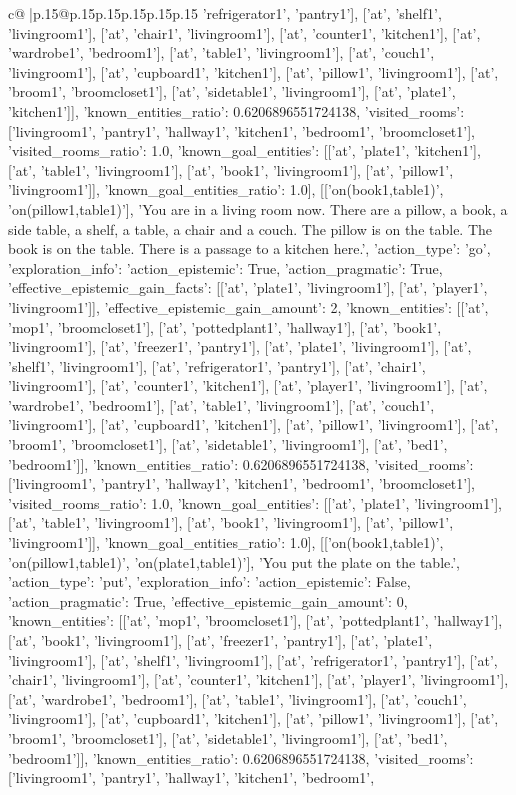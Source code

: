 \documentclass{article}
\begin{document}
{\begin{supertabular}{c@{$\;$}|p{.15\linewidth}@{}p{.15\linewidth}p{.15\linewidth}p{.15\linewidth}p{.15\linewidth}p{.15\linewidth}}
{{{'refrigerator1', 'pantry1'], ['at', 'shelf1', 'livingroom1'], ['at', 'chair1', 'livingroom1'], ['at', 'counter1', 'kitchen1'], ['at', 'wardrobe1', 'bedroom1'], ['at', 'table1', 'livingroom1'], ['at', 'couch1', 'livingroom1'], ['at', 'cupboard1', 'kitchen1'], ['at', 'pillow1', 'livingroom1'], ['at', 'broom1', 'broomcloset1'], ['at', 'sidetable1', 'livingroom1'], ['at', 'plate1', 'kitchen1']], 'known_entities_ratio': 0.6206896551724138, 'visited_rooms': ['livingroom1', 'pantry1', 'hallway1', 'kitchen1', 'bedroom1', 'broomcloset1'], 'visited_rooms_ratio': 1.0, 'known_goal_entities': [['at', 'plate1', 'kitchen1'], ['at', 'table1', 'livingroom1'], ['at', 'book1', 'livingroom1'], ['at', 'pillow1', 'livingroom1']], 'known_goal_entities_ratio': 1.0}}], [['on(book1,table1)', 'on(pillow1,table1)'], 'You are in a living room now. There are a pillow, a book, a side table, a shelf, a table, a chair and a couch. The pillow is on the table. The book is on the table. There is a passage to a kitchen here.', {'action_type': 'go', 'exploration_info': {'action_epistemic': True, 'action_pragmatic': True, 'effective_epistemic_gain_facts': [['at', 'plate1', 'livingroom1'], ['at', 'player1', 'livingroom1']], 'effective_epistemic_gain_amount': 2, 'known_entities': [['at', 'mop1', 'broomcloset1'], ['at', 'pottedplant1', 'hallway1'], ['at', 'book1', 'livingroom1'], ['at', 'freezer1', 'pantry1'], ['at', 'plate1', 'livingroom1'], ['at', 'shelf1', 'livingroom1'], ['at', 'refrigerator1', 'pantry1'], ['at', 'chair1', 'livingroom1'], ['at', 'counter1', 'kitchen1'], ['at', 'player1', 'livingroom1'], ['at', 'wardrobe1', 'bedroom1'], ['at', 'table1', 'livingroom1'], ['at', 'couch1', 'livingroom1'], ['at', 'cupboard1', 'kitchen1'], ['at', 'pillow1', 'livingroom1'], ['at', 'broom1', 'broomcloset1'], ['at', 'sidetable1', 'livingroom1'], ['at', 'bed1', 'bedroom1']], 'known_entities_ratio': 0.6206896551724138, 'visited_rooms': ['livingroom1', 'pantry1', 'hallway1', 'kitchen1', 'bedroom1', 'broomcloset1'], 'visited_rooms_ratio': 1.0, 'known_goal_entities': [['at', 'plate1', 'livingroom1'], ['at', 'table1', 'livingroom1'], ['at', 'book1', 'livingroom1'], ['at', 'pillow1', 'livingroom1']], 'known_goal_entities_ratio': 1.0}}], [['on(book1,table1)', 'on(pillow1,table1)', 'on(plate1,table1)'], 'You put the plate on the table.', {'action_type': 'put', 'exploration_info': {'action_epistemic': False, 'action_pragmatic': True, 'effective_epistemic_gain_amount': 0, 'known_entities': [['at', 'mop1', 'broomcloset1'], ['at', 'pottedplant1', 'hallway1'], ['at', 'book1', 'livingroom1'], ['at', 'freezer1', 'pantry1'], ['at', 'plate1', 'livingroom1'], ['at', 'shelf1', 'livingroom1'], ['at', 'refrigerator1', 'pantry1'], ['at', 'chair1', 'livingroom1'], ['at', 'counter1', 'kitchen1'], ['at', 'player1', 'livingroom1'], ['at', 'wardrobe1', 'bedroom1'], ['at', 'table1', 'livingroom1'], ['at', 'couch1', 'livingroom1'], ['at', 'cupboard1', 'kitchen1'], ['at', 'pillow1', 'livingroom1'], ['at', 'broom1', 'broomcloset1'], ['at', 'sidetable1', 'livingroom1'], ['at', 'bed1', 'bedroom1']], 'known_entities_ratio': 0.6206896551724138, 'visited_rooms': ['livingroom1', 'pantry1', 'hallway1', 'kitchen1', 'bedroom1', }}}
\end{supertabular}}
\end{document}
